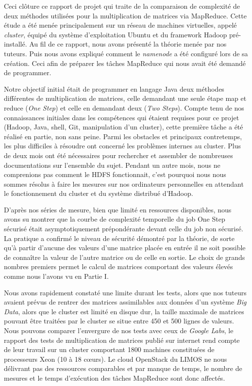 
Ceci clôture ce rapport de projet qui traite de la comparaison de complexité de deux méthodes utilisées pour la multiplication de matrices via MapReduce. Cette étude a été menée principalement sur un réseau de machines virtuelles, appelé \textit{cluster}, équipé du système d'exploitation Ubuntu et du framework Hadoop pré-installé. Au fil de ce rapport, nous avons présenté la théorie menée par nos tuteurs. Puis nous avons expliqué comment le \textit{namenode} a été configuré lors de sa création. Ceci afin de préparer les tâches MapReduce qui nous avait été demandé de programmer.\par
Notre objectif initial était de programmer en langage Java deux méthodes différentes de multiplication de matrices, celle demandant une seule étape map et reduce (\textit{One Step}) et celle en demandant deux (\textit{Two Steps}). Compte tenu de nos connaissances initiales dans les compétences qui étaient requises pour ce projet (Hadoop, Java, shell, Git, manipulation d'un cluster), cette première tâche a été réalisé en partie, non sans peine. Parmi les obstacles et principaux contretemps, les plus difficiles à résoudre ont concerné les problèmes internes au cluster. Plus de deux mois ont été nécessaires pour rechercher et assembler de nombreuses documentations sur l'ensemble du sujet. Pendant un autre mois, nous ne comprenions pas comment le HDFS fonctionnait, c'est pourquoi nous nous sommes résolus à faire les mesures sur nos ordinateurs personnelles en attendant le fonctionnement du cluster et du système distribué d'Hadoop.\par
D'après nos séries de mesure, bien que limité en ressources disponibles, nous avons su montrer que la courbe de complexité temporelle du job One Step sécurisé était asymptotiquement prépondérante devant celle du job non sécurisé. La pratique a confirmé le niveau de sécurité démontré par la théorie, de sorte qu'à partir d'aucune des valeurs d'une matrice placée en entrée il ne soit possible de connaître la valeur de l'autre matrice ou de celle en sortie. Le choix de grands nombres premiers permet le calcul de matrices comportant des valeurs élevés comme nous l'avons vu en Partie I.\par
Nous avons rapidement constaté une limite durant les tests, alors que nos tuteurs avaient prévus de rentrer des matrices assimilables aux données d'un système \textit{Big Data}, alors que le cluster est limité en disque dur, la taille maximale de matrices pouvant être traitées par le cluster se situe entre 450 et 500 lignes de valeurs. Nous pouvons comparer l'envergure de nos tests avec ceux de \textit{Google Labs}, le rapport des tests de multiplication de matrices publié sur internet rend compte de leur travail sur un cluster comportant 1800 machines constituées de processeurs Xeon (10 à 18 cœurs). Le cloud OpenStack du LIMOS ne nous délivrant pas des ressources comparables et par manque de temps, le nombre de mesures et le temps d'exécution des tâches MapReduce sont donc affectés.\par
